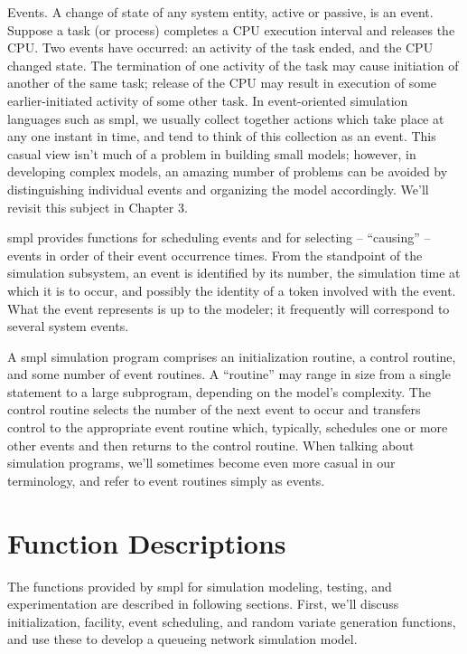 Events. A change of state of any system entity, active or passive, is an
event. Suppose a task (or process) completes a CPU execution interval and
releases the CPU. Two events have occurred: an activity of the task ended, and
the CPU changed state. The termination of one activity of the task may cause
initiation of another of the same task; release of the CPU may result in
execution of some earlier-initiated activity of some other task. In
event-oriented simulation languages such as smpl, we usually collect together
actions which take place at any one instant in time, and tend to think of this
collection as an event. This casual view isn't much of a problem in building
small models; however, in developing complex models, an amazing number of
problems can be avoided by distinguishing individual events and organizing the
model accordingly. We'll revisit this subject in Chapter 3.

smpl provides functions for scheduling events and for selecting -- ``causing''
-- events in order of their event occurrence times. From the standpoint of the
simulation subsystem, an event is identified by its number, the simulation
time at which it is to occur, and possibly the identity of a token involved
with the event. What the event represents is up to the modeler; it frequently
will correspond to several system events.

A smpl simulation program comprises an initialization routine, a control
routine, and some number of event routines. A ``routine'' may range in size
from a single statement to a large subprogram, depending on the model's
complexity. The control routine selects the number of the next event to occur
and transfers control to the appropriate event routine which, typically,
schedules one or more other events and then returns to the control routine.
When talking about simulation programs, we'll sometimes become even more
casual in our terminology, and refer to event routines simply as events.

\section{Function Descriptions}
\label{sec:smpl-function-descriptions}

The functions provided by smpl for simulation modeling, testing, and
experimentation are described in following sections. First, we'll discuss
initialization, facility, event scheduling, and random variate generation
functions, and use these to develop a queueing network simulation model.

